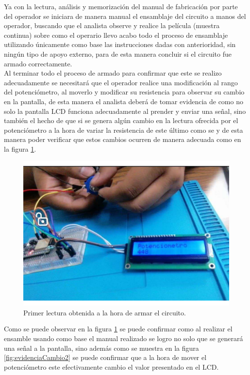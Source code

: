     Ya con la lectura, análisis y memorización del manual de fabricación por parte del operador se iniciara de manera manual el ensamblaje del circuito a manos del operador, buscando que el analista observe y realice la película (muestra continua) sobre como el operario llevo acabo todo el proceso de ensamblaje utilizando únicamente como base las instrucciones dadas con anterioridad, sin ningún tipo de apoyo externo, para de esta manera concluir si el circuito fue armado correctamente.
    \\Al terminar todo el proceso de armado para confirmar que este se realizo adecuadamente se necesitará que el operador realice una modificación al rango del potenciómetro, al moverlo y modificar su resistencia para observar su cambio en la pantalla, de esta manera el analista deberá de tomar evidencia de como no solo la pantalla LCD funciona adecuadamente al prender y enviar una señal, sino también el hecho de que si se genera algún cambio en la lectura ofrecida por el potenciómetro a la hora de variar la resistencia de este último como se y de esta manera poder verificar que estos cambios ocurren de manera adecuada como en la figura \ref{fig:evidenciaCambio1}.
                \begin{figure}[H]
        \centering
        \includegraphics[trim = {50mm 0mm 0mm 0mm},clip,scale=0.3]{19/Img/evidenciaCambio1.pdf}
        \caption{Primer lectura obtenida a la hora de armar el circuito.}
        \label{fig:evidenciaCambio1}
    \end{figure}
    Como se puede observar en la figura \ref{fig:evidenciaCambio1} se puede confirmar como al realizar el ensamble usando como base el manual realizado se logro no solo que se generará una señal a la pantalla, sino además como se muestra en la figura \ref{fig:evidenciaCambio2} se puede confirmar que a la hora de mover el potenciómetro este efectivamente cambio el valor presentado en el LCD.
